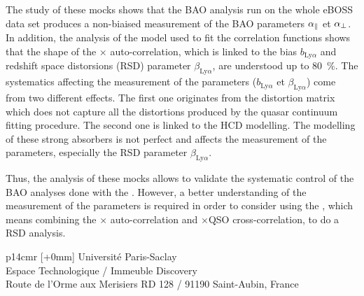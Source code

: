 \begin{mdframed}[linecolor=Prune,linewidth=1]
\begin{small}
\begin{multicols}{2}
  The study of these mocks shows that the BAO analysis run on the whole \lya{} eBOSS data set produces a non-biaised measurement of the BAO parameters $\alpha_{\parallel}{}$ et $\alpha_{\perp}{}$.
  In addition, the analysis of the model used to fit the correlation functions shows that the shape of the \lya{}$\times$\lya{} auto-correlation, which is linked to the bias $b_{\mathrm{Ly}\alpha}$ and redshift space distorsions (RSD) parameter $\beta_{\mathrm{Ly}\alpha}$, are understood up to \SI{80}{\percent}.
  The systematics affecting the measurement of the \lya{} parameters ($b_{\mathrm{Ly}\alpha}$ et $\beta_{\mathrm{Ly}\alpha}$) come from two different effects.
  The first one originates from the distortion matrix which does not capture all the distortions produced by the quasar continuum fitting procedure.
  The second one is linked to the HCD modelling.
  The modelling of these strong absorbers is not perfect and affects the measurement of the \lya{} parameters, especially the RSD parameter $\beta_{\mathrm{Ly}\alpha}$.

  Thus, the analysis of these mocks allows to validate the systematic control of the BAO analyses done with the \lya{}.
  However, a better understanding of the measurement of the \lya{} parameters is required in order to consider using the \lya{}, which means combining the \lya{}$\times$\lya{} auto-correlation and \lya{}$\times$QSO cross-correlation, to do a RSD analysis.
\end{multicols}
\end{small}
\end{mdframed}

\vspace{3cm} %
\selectfont
\begin{tabular}{p{14cm}r}
[+0mm]{{\color{Prune} Université Paris-Saclay\\
Espace Technologique / Immeuble Discovery\\
  Route de l’Orme aux Merisiers RD 128 / 91190 Saint-Aubin, France}} \\
\end{tabular}
